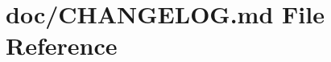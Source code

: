\hypertarget{_c_h_a_n_g_e_l_o_g_8md}{}\section{doc/\+C\+H\+A\+N\+G\+E\+L\+OG.md File Reference}
\label{_c_h_a_n_g_e_l_o_g_8md}
